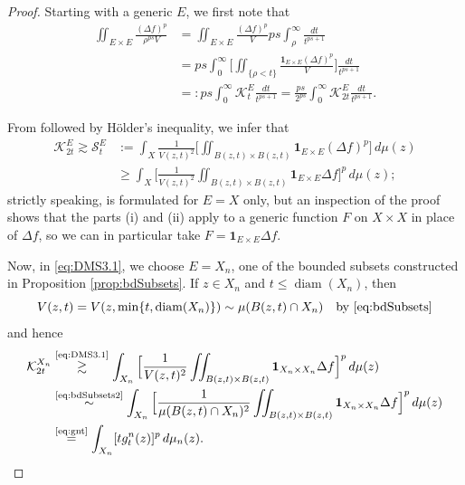 \documentclass[11pt]{amsart}
\theoremstyle{definition}
\theoremstyle{remark}
\numberwithin{equation}{section}
\begin{document}
\begin{proof}
Starting with a generic $E$, we first note that
\begin{equation}\label{eq:intKtE}
\begin{split}
  \iint_{E\times E}\frac{(\Delta f)^p}{\rho^{ps}V}
  &=\iint_{E\times E}\frac{(\Delta f)^p}{V}ps\int_{\rho}^\infty\frac{dt}{t^{ps+1}} \\
  &=ps\int_0^\infty\Big[\iint_{\{\rho<t\}}
  \frac{\mathbf{1}_{E\times E}(\Delta f)^p}{V}\Big]\frac{dt}{t^{ps+1}} \\
  &=:ps\int_0^\infty\mathcal K_t^E\frac{dt}{t^{ps+1}}
  =\frac{ps}{2^{ps}}\int_0^\infty\mathcal K_{2t}^E\frac{dt}{t^{ps+1}}.
\end{split}
\end{equation}

From \cite[Lemma 3.1(i--ii)]{DMS} followed by H\"older's inequality, we infer that
\begin{equation}
\begin{split}
   \mathcal K_{2t}^E\gtrsim\mathcal S_t^E
   &:=\int_X\frac{1}{V(z,t)^2}\Big[\iint_{B(z,t)\times B(z,t)} \mathbf{1}_{E\times
   E}(\Delta f)^p \Big]\,d\mu(z) \\
   &\geq
   \int_X\Big[\frac{1}{V(z,t)^2} \iint_{B(z,t)\times B(z,t)} \mathbf{1}_{E\times E}\Delta f
   \Big]^p\, d\mu(z);
\end{split}\label{eq:DMS3.1}
\end{equation}
strictly speaking, \cite[Lemma 3.1]{DMS} is formulated for $E=X$ only,
but an inspection of the proof shows that the parts (i) and (ii) apply to a generic function $F$
on $X\times X$
in place of $\Delta f$, so we can in particular take $F=\mathbf{1}_{E\times E}\Delta f$.


Now, in \eqref{eq:DMS3.1}, we choose $E=X_n$, one of the bounded subsets constructed in
Proposition \ref{prop:bdSubsets}. If $z\in X_n$ and $t\leq\operatorname{diam}(X_n)$, then
\begin{equation}
   V(z,t)=V(z,\min\{t,\operatorname{diam}(X_n)\})\sim
   \mu(B(z,t)\cap X_n)\quad\text{by \eqref{eq:bdSubsets}}
   \label{eq:bdSubsets2}
\end{equation}
and hence
\begin{equation}
\begin{split}
   \mathcal K_{2t}^{X_n}
   &\overset{\text{\eqref{eq:DMS3.1}}}{\gtrsim}
   \int_{X_n}\Big[\frac{1}{V(z,t)^2}\iint_{B(z,t)\times B(z,t)}
   \mathbf{1}_{X_n\times X_n}\Delta f\Big]^p\,d\mu(z) \\
   &\overset{\text{\eqref{eq:bdSubsets2}}}{\sim}
    \int_{X_n}\Big[\frac{1}{\mu(B(z,t)\cap X_n)^2}
   \iint_{B(z,t)\times B(z,t)}
    \mathbf{1}_{X_n\times X_n}\Delta f\Big]^p\,d\mu(z)     \\
   & \overset{\text{\eqref{eq:gnt}}}{=}\int_{X_n} [t g^n_t(z)]^p\,d\mu_n(z).
\end{split}\label{eq:KtXn}
\end{equation}


\end{proof}
\end{document}

